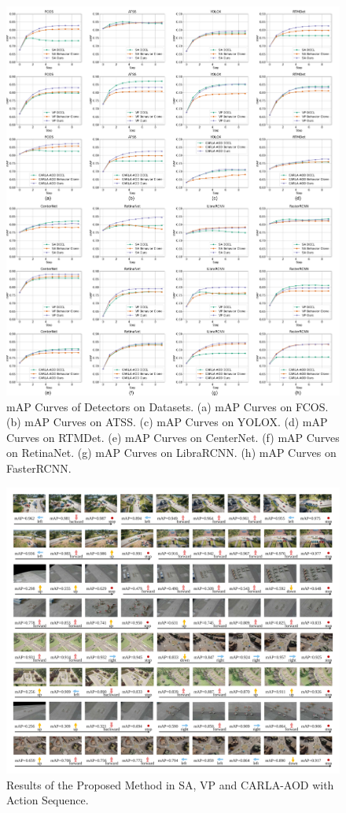 \documentclass[lettersize,journal]{IEEEtran}
\begin{document}
\begin{figure}[!t]
    \centering
    \includegraphics[width=1.0\textwidth]{fig/mAPs.png}
    \caption{mAP Curves of Detectors on Datasets. (a) mAP Curves on FCOS. (b) mAP Curves on ATSS. (c) mAP Curves on YOLOX. (d) mAP Curves on RTMDet. (e) mAP Curves on CenterNet. (f) mAP Curves on RetinaNet. (g) mAP Curves on LibraRCNN. (h) mAP Curves on FasterRCNN.}
    \label{mAPs}
\end{figure}

\begin{figure}[!t]
    \centering
    \includegraphics[clip=true, width=1.0\textwidth]{fig/visualization.pdf}
    \caption{Results of the Proposed Method in SA, VP and CARLA-AOD with Action Sequence.}
    \label{visualization}
\end{figure}
\end{document}
